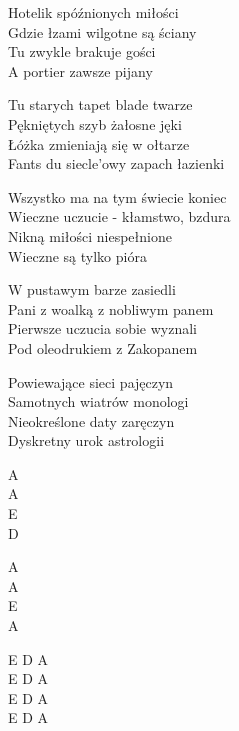 \begin{text}
    Hotelik spóźnionych miłości\\
    Gdzie łzami wilgotne są ściany\\
    Tu zwykle brakuje gości\\
    A portier zawsze pijany

    Tu starych tapet blade twarze\\
    Pękniętych szyb żałosne jęki\\
    Łóżka zmieniają się w ołtarze\\
    Fants du siecle’owy zapach łazienki

    Wszystko ma na tym świecie koniec\\
    Wieczne uczucie - kłamstwo, bzdura\\
    Nikną miłości niespełnione\\
    Wieczne są tylko pióra

    W pustawym barze zasiedli\\
    Pani z woalką z nobliwym panem\\
    Pierwsze uczucia sobie wyznali\\
    Pod oleodrukiem z Zakopanem

    Powiewające sieci pajęczyn\\
    Samotnych wiatrów monologi\\
    Nieokreślone daty zaręczyn\\
    Dyskretny urok astrologii
\end{text}
\begin{chord}
    A\\
    A\\
    E\\
    D

    A\\
    A\\
    E\\
    A

    E D A\\
    E D A\\
    E D A\\
    E D A
\end{chord}
